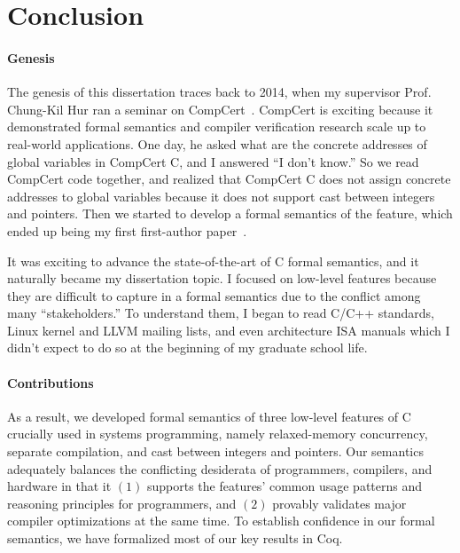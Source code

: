 \section{Conclusion}
\label{sec:conclusion}

\paragraph{Genesis}

The genesis of this dissertation traces back to 2014, when my supervisor Prof. Chung-Kil Hur ran a
seminar on CompCert~\cite{compcert}.  CompCert is exciting because it demonstrated formal semantics
and compiler verification research scale up to real-world applications.  One day, he asked what are
the concrete addresses of global variables in CompCert C, and I answered ``I don't know.''  So we
read CompCert code together, and realized that CompCert C does not assign concrete addresses to
global variables because it does not support cast between integers and pointers.  Then we started to
develop a formal semantics of the feature, which ended up being my first first-author
paper~\cite{intptrcast}.

It was exciting to advance the state-of-the-art of C formal semantics, and it naturally became my
dissertation topic.  I focused on low-level features because they are difficult to capture in a
formal semantics due to the conflict among many ``stakeholders.''  To understand them, I began to
read C/C++ standards, Linux kernel and LLVM mailing lists, and even architecture ISA manuals which I
didn't expect to do so at the beginning of my graduate school life.



\paragraph{Contributions}

As a result, we developed formal semantics of three low-level features of C crucially used in
systems programming, namely relaxed-memory concurrency, separate compilation, and cast between
integers and pointers.  Our semantics adequately balances the conflicting desiderata of programmers,
compilers, and hardware in that it $(1)$ supports the features' common usage patterns and reasoning
principles for programmers, and $(2)$ provably validates major compiler optimizations at the same
time.  To establish confidence in our formal semantics, we have formalized most of our key results
in Coq.


